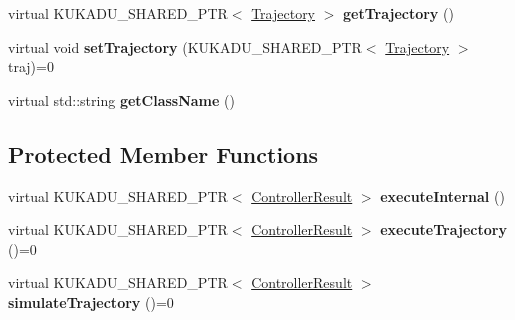 \begin{DoxyCompactItemize}
\item 
virtual K\+U\+K\+A\+D\+U\+\_\+\+S\+H\+A\+R\+E\+D\+\_\+\+P\+TR$<$ \hyperlink{classkukadu_1_1Trajectory}{Trajectory} $>$ {\bfseries get\+Trajectory} ()\hypertarget{classkukadu_1_1TrajectoryExecutor_a8e33775469d04f297810254dc2a11ae5}{}\label{classkukadu_1_1TrajectoryExecutor_a8e33775469d04f297810254dc2a11ae5}

\item 
virtual void {\bfseries set\+Trajectory} (K\+U\+K\+A\+D\+U\+\_\+\+S\+H\+A\+R\+E\+D\+\_\+\+P\+TR$<$ \hyperlink{classkukadu_1_1Trajectory}{Trajectory} $>$ traj)=0\hypertarget{classkukadu_1_1TrajectoryExecutor_ac349c2570306fc32731f34ee05e92741}{}\label{classkukadu_1_1TrajectoryExecutor_ac349c2570306fc32731f34ee05e92741}

\item 
virtual std\+::string {\bfseries get\+Class\+Name} ()\hypertarget{classkukadu_1_1TrajectoryExecutor_a7466b6793fb5e1467e554f56c6b0fbf4}{}\label{classkukadu_1_1TrajectoryExecutor_a7466b6793fb5e1467e554f56c6b0fbf4}

\end{DoxyCompactItemize}
\subsection*{Protected Member Functions}
\begin{DoxyCompactItemize}
\item 
virtual K\+U\+K\+A\+D\+U\+\_\+\+S\+H\+A\+R\+E\+D\+\_\+\+P\+TR$<$ \hyperlink{classkukadu_1_1ControllerResult}{Controller\+Result} $>$ {\bfseries execute\+Internal} ()\hypertarget{classkukadu_1_1TrajectoryExecutor_a1ece75ed447f4161e15ab1995360db32}{}\label{classkukadu_1_1TrajectoryExecutor_a1ece75ed447f4161e15ab1995360db32}

\item 
virtual K\+U\+K\+A\+D\+U\+\_\+\+S\+H\+A\+R\+E\+D\+\_\+\+P\+TR$<$ \hyperlink{classkukadu_1_1ControllerResult}{Controller\+Result} $>$ {\bfseries execute\+Trajectory} ()=0\hypertarget{classkukadu_1_1TrajectoryExecutor_a1b2a048b979663d8ed21a3b5652528a4}{}\label{classkukadu_1_1TrajectoryExecutor_a1b2a048b979663d8ed21a3b5652528a4}

\item 
virtual K\+U\+K\+A\+D\+U\+\_\+\+S\+H\+A\+R\+E\+D\+\_\+\+P\+TR$<$ \hyperlink{classkukadu_1_1ControllerResult}{Controller\+Result} $>$ {\bfseries simulate\+Trajectory} ()=0\hypertarget{classkukadu_1_1TrajectoryExecutor_a684f7dda54b842e91f969f8a7385350d}{}\label{classkukadu_1_1TrajectoryExecutor_a684f7dda54b842e91f969f8a7385350d}

\end{DoxyCompactItemize}
